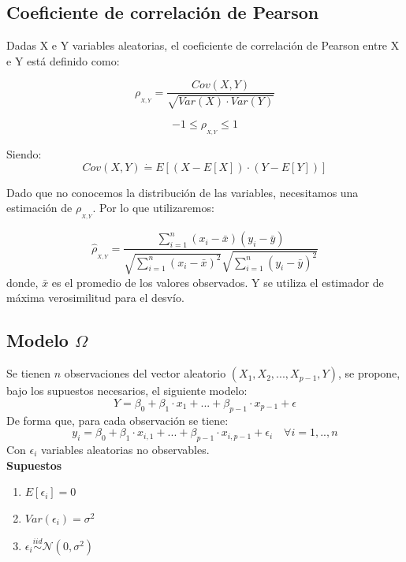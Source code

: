 \subsection*{Coeficiente de correlación de Pearson}
Dadas X e Y variables aleatorias, el coeficiente de correlación de Pearson entre X e Y está definido como:

\begin{minipage}{\linewidth}
  \centering
  \begin{minipage}{0.45\linewidth}
    $$\rho_{_{X,Y}} = \frac{Cov(X, Y)}{\sqrt{Var(X) \cdot Var(Y)}}$$
  \end{minipage}
  \hspace{0.05\linewidth}
  \begin{minipage}{0.45\linewidth}
    $$-1 \leq \rho_{_{X,Y}} \leq 1$$
  \end{minipage}
\end{minipage}

Siendo:
$$Cov(X,Y) \dot{=} E[(X - E[X]) \cdot (Y - E[Y])]$$

Dado que no conocemos la distribución de las variables, necesitamos una estimación de $\rho_{_{X,Y}}$. Por lo que utilizaremos:

$$\hat{\rho}_{_{X,Y}} = \frac{\sum\limits_{i=1}^{n} (x_i - \bar{x})(y_i - \bar{y})} {\sqrt{\sum\limits_{i=1}^{n}(x_i - \bar{x})^2} \sqrt{\sum\limits_{i=1}^{n}(y_i - \bar{y})^2}}$$
donde, $\bar{x}$ es el promedio de los valores observados. Y se utiliza el estimador de máxima verosimilitud para el desvío.

\subsection*{Modelo $\Omega$}
Se tienen $n$ observaciones del vector aleatorio $(X_{1}, X_{2}, ..., X_{p-1}, Y)$, se propone, bajo los supuestos necesarios, el siguiente modelo:
$$Y = \beta_{0} + \beta_{1} \cdot x_{1} + ... + \beta_{p-1} \cdot x_{p-1} + \epsilon$$
De forma que, para cada observación se tiene:
$$y_i = \beta_{0} + \beta_{1} \cdot x_{i,1} + ... + \beta_{p-1} \cdot x_{i, p-1} + \epsilon_{i} \quad  \forall i = 1,..,n$$
Con $\epsilon_{i}$ variables aleatorias no observables.\\

\textbf{Supuestos}
\begin{enumerate}
    \item $E[\epsilon_{i}] = 0$
    \item $Var(\epsilon_{i}) = \sigma^2$
    \item $\epsilon_{i} \stackrel{iid}{\sim} \mathcal{N}(0, \sigma^2)$
\end{enumerate}

